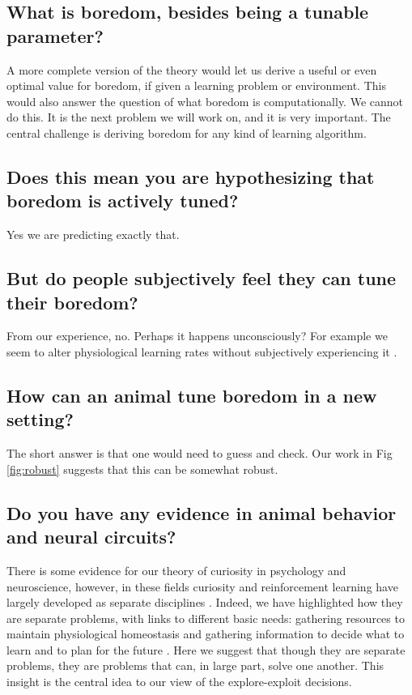\subsection*{What is boredom, besides being a tunable parameter?}
A more complete version of the theory would let us derive a useful or even optimal value for boredom, if given a learning problem or environment. This would also answer the question of what boredom is computationally. We cannot do this. It is the next problem we will work on, and it is very important. The central challenge is deriving boredom for any kind of learning algorithm.


\subsection*{Does this mean you are hypothesizing that boredom is actively tuned?}
Yes we are predicting exactly that.


\subsection*{But do people subjectively feel they can tune their boredom?}
From our experience, no. Perhaps it happens unconsciously? For example we seem to alter physiological learning rates without subjectively experiencing it \cite{Behrens2007}.


\subsection*{How can an animal tune boredom in a new setting?}
The short answer is that one would need to guess and check. Our work in Fig \ref{fig:robust} suggests that this can be somewhat robust.


\subsection*{Do you have any evidence in animal behavior and neural circuits?}
There is some evidence for our theory of curiosity in psychology and neuroscience, however, in these fields curiosity and reinforcement learning have largely developed as separate disciplines \cite{Berlyne1950,Kidd2015,Sutton2018}. Indeed, we have highlighted how they are separate problems, with links to different basic needs: gathering resources to maintain physiological homeostasis \cite{Keramati2014,Juechems2019} and gathering information to decide what to learn and to plan for the future \cite{Valiant1984,Sutton2018}. Here we suggest that though they are separate problems, they are problems that can, in large part, solve one another. This insight is the central idea to our view of the explore-exploit decisions. 

